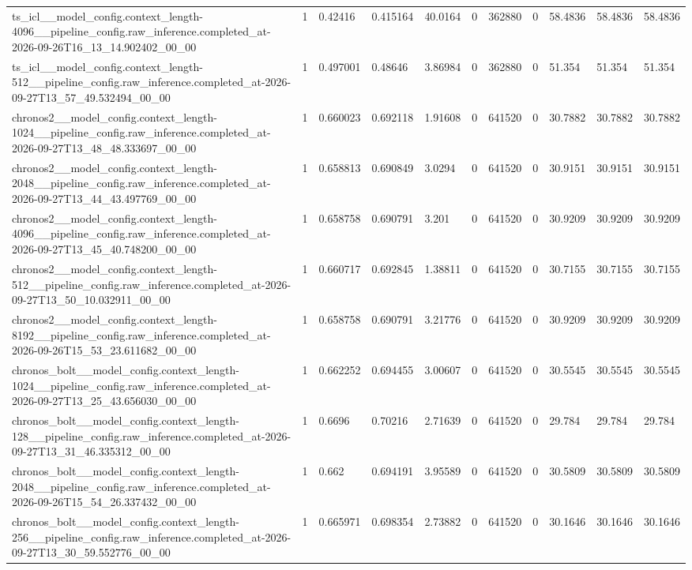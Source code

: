 \begin{tabular}{lllllllllll}
ts\_icl\_\_model\_config.context\_length-4096\_\_pipeline\_config.raw\_inference.completed\_at-2026-09-26T16\_13\_14.902402\_00\_00 & 1 & 0.42416 & 0.415164 & 40.0164 & 0 & 362880 & 0 & 58.4836 & 58.4836 & 58.4836 \\
ts\_icl\_\_model\_config.context\_length-512\_\_pipeline\_config.raw\_inference.completed\_at-2026-09-27T13\_57\_49.532494\_00\_00 & 1 & 0.497001 & 0.48646 & 3.86984 & 0 & 362880 & 0 & 51.354 & 51.354 & 51.354 \\
chronos2\_\_model\_config.context\_length-1024\_\_pipeline\_config.raw\_inference.completed\_at-2026-09-27T13\_48\_48.333697\_00\_00 & 1 & 0.660023 & 0.692118 & 1.91608 & 0 & 641520 & 0 & 30.7882 & 30.7882 & 30.7882 \\
chronos2\_\_model\_config.context\_length-2048\_\_pipeline\_config.raw\_inference.completed\_at-2026-09-27T13\_44\_43.497769\_00\_00 & 1 & 0.658813 & 0.690849 & 3.0294 & 0 & 641520 & 0 & 30.9151 & 30.9151 & 30.9151 \\
chronos2\_\_model\_config.context\_length-4096\_\_pipeline\_config.raw\_inference.completed\_at-2026-09-27T13\_45\_40.748200\_00\_00 & 1 & 0.658758 & 0.690791 & 3.201 & 0 & 641520 & 0 & 30.9209 & 30.9209 & 30.9209 \\
chronos2\_\_model\_config.context\_length-512\_\_pipeline\_config.raw\_inference.completed\_at-2026-09-27T13\_50\_10.032911\_00\_00 & 1 & 0.660717 & 0.692845 & 1.38811 & 0 & 641520 & 0 & 30.7155 & 30.7155 & 30.7155 \\
chronos2\_\_model\_config.context\_length-8192\_\_pipeline\_config.raw\_inference.completed\_at-2026-09-26T15\_53\_23.611682\_00\_00 & 1 & 0.658758 & 0.690791 & 3.21776 & 0 & 641520 & 0 & 30.9209 & 30.9209 & 30.9209 \\
chronos\_bolt\_\_model\_config.context\_length-1024\_\_pipeline\_config.raw\_inference.completed\_at-2026-09-27T13\_25\_43.656030\_00\_00 & 1 & 0.662252 & 0.694455 & 3.00607 & 0 & 641520 & 0 & 30.5545 & 30.5545 & 30.5545 \\
chronos\_bolt\_\_model\_config.context\_length-128\_\_pipeline\_config.raw\_inference.completed\_at-2026-09-27T13\_31\_46.335312\_00\_00 & 1 & 0.6696 & 0.70216 & 2.71639 & 0 & 641520 & 0 & 29.784 & 29.784 & 29.784 \\
chronos\_bolt\_\_model\_config.context\_length-2048\_\_pipeline\_config.raw\_inference.completed\_at-2026-09-26T15\_54\_26.337432\_00\_00 & 1 & 0.662 & 0.694191 & 3.95589 & 0 & 641520 & 0 & 30.5809 & 30.5809 & 30.5809 \\
chronos\_bolt\_\_model\_config.context\_length-256\_\_pipeline\_config.raw\_inference.completed\_at-2026-09-27T13\_30\_59.552776\_00\_00 & 1 & 0.665971 & 0.698354 & 2.73882 & 0 & 641520 & 0 & 30.1646 & 30.1646 & 30.1646 \\

\end{tabular}
